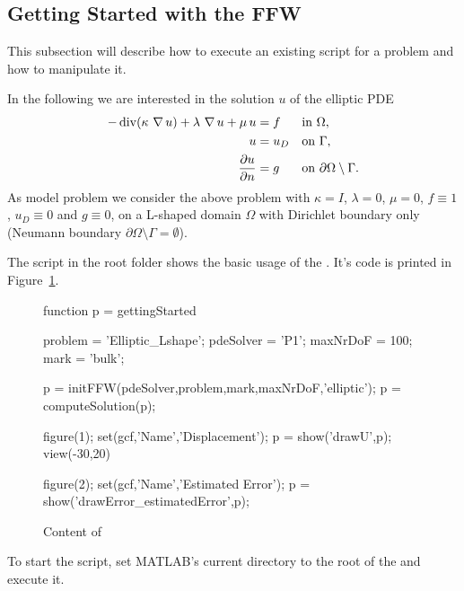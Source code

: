 \subsection{Getting Started with the FFW}
\label{sect:QuickStart:gettingStarted}

\noindent This subsection will describe how to execute an existing script for a problem and how to manipulate it.\medskip

\noindent In the following we are interested in the solution $u$ of the elliptic PDE
\begin{align*}
- \operatorname{div} (\kappa \,\operatorname{\nabla} u) + \lambda \,\operatorname{\nabla} u + \mu \, u &= f &&\text{in } \Omega,\\
u &= u_D &&\text{on } \Gamma,\\
\frac{\partial u}{\partial n} &= g &&\text{on } \partial\Omega \setminus \Gamma.
\end{align*}
As model problem we consider the above problem with $\kappa = I$, $\lambda = 0$, $\mu = 0$, $f \equiv 1$, $u_D \equiv 0$ and $g \equiv 0$, on a L-shaped domain $\Omega$ with Dirichlet boundary only (Neumann boundary $\partial\Omega \setminus \Gamma = \emptyset$).\medskip

\noindent The script  in the root folder shows the basic usage of the \FFW\!. It's code is printed in Figure~\ref{sect:Quickstart.fig.code:gettingStarted}.

\begin{figure}[ht!]
\begin{pcoden}
function p = gettingStarted

problem = 'Elliptic_Lshape';
pdeSolver = 'P1';
maxNrDoF = 100;
mark = 'bulk';

p = initFFW(pdeSolver,problem,mark,maxNrDoF,'elliptic');
p = computeSolution(p);

figure(1);
set(gcf,'Name','Displacement');
p = show('drawU',p);
view(-30,20)

figure(2);
set(gcf,'Name','Estimated Error');
p = show('drawError_estimatedError',p);
\end{pcoden}

\caption{Content of }\label{sect:Quickstart.fig.code:gettingStarted}
\end{figure}

\medskip
\noindent To start the script, set MATLAB's current directory to the root of the \FFW and execute it.\medskip

